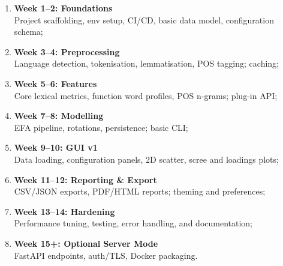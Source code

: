 \begin{enumerate}
    \item \textbf{Week 1--2: Foundations} \\
          Project scaffolding, env setup, CI/CD, basic data model, configuration schema;
    \item \textbf{Week 3--4: Preprocessing} \\
          Language detection, tokenisation, lemmatisation, POS tagging; caching;
    \item \textbf{Week 5--6: Features} \\
          Core lexical metrics, function word profiles, POS n-grams; plug-in API;
    \item \textbf{Week 7--8: Modelling} \\
          EFA pipeline, rotations, persistence; basic CLI;
    \item \textbf{Week 9--10: GUI v1} \\
          Data loading, configuration panels, 2D scatter, scree and loadings plots;
    \item \textbf{Week 11--12: Reporting \& Export} \\
          CSV/JSON exports, PDF/HTML reports; theming and preferences;
    \item \textbf{Week 13--14: Hardening} \\
          Performance tuning, testing, error handling, and documentation;
    \item \textbf{Week 15+: Optional Server Mode} \\
          FastAPI endpoints, auth/TLS, Docker packaging.
\end{enumerate}
